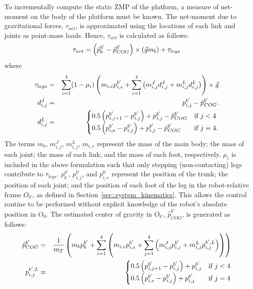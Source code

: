 		To incrementally compute the static ZMP of the platform, a measure of net-moment on the body of the platform must be known. The net-moment due to gravitational forces, $\tau_{net}$, is approximated using the locations of each link and joints as point-mass loads. Hence, $\tau_{net}$ is calculated as follows:
			\begin{equation}
				\tau_{net} 	=  \left(\bar{p}_{b}^{b'}-\hat{p}_{COG}^{b'} \right) \times \left(\vec{g} m_{b}\right)	+ \tau_{legs}
				\label{eq::net_moment}
			\end{equation}
		where
			\begin{eqnarray*}
					\tau_{legs}		& = & \sum_{i=1}^{4} (1-\mu_{i}) \left( m_{i,e} p_{i,e}^{b'} + \sum_{i=1}^{4}   \left( m_{i,j}^{J} d_{i,j}^{J} + m_{i,j}^{L} d_{i,j}^{L} \right) \right) \times \vec{g} \nonumber \\
					d_{i,j}^{J} 	& = & {{p}_{i,j}^{b'}-\hat{p}_{COG}^{b'}.} \nonumber \\														
					d_{i,j}^{L} 	& = &
					\begin{cases}
					{ 0.5  \left({p}_{i,j+1}^{b'}-{p}_{i,j}^{b'}\right) + {p}_{i,j}^{b'} - \hat{p}_{COG}^{b'}} 	&\text{if } j < 4 \\
					{ 0.5  \left({p}_{i,e}^{b'}-{p}_{i,j}^{b'}\right) + {p}_{i,j}^{b'} - \hat{p}_{COG}^{b'}} 		&\text{if } j = 4.
					\end{cases} \nonumber
				\label{eq::Levers}
			\end{eqnarray*}
		The terms $m_{b}$, $m_{i,j}^{J}$, $m_{i,j}^{L}$, $m_{i,e}$ represent the mass of the main body; the mass of each joint; the mass of each link; and the mass of each foot, respectively. $\mu_{i}$ is included in the above formulation such that only stepping (non-contacting) legs contribute to  $\tau_{legs}$. ${p}_{b}^{b'}$, ${p}_{i,j}^{b'}$, and ${p}_{i,e}^{b'}$ represent the position of the trunk; the position of each \Jth joint; and the position of each foot of the \Ith leg in the robot-relative frame $O_{b'}$, as defined in Section~\ref{sec::system_kinematics}. This allows the control routine to be performed without explicit knowledge of the robot's absolute position in $O_{0}$. The estimated center of gravity in $O_{b'}$, $\hat{p}_{COG}^{b'}$, is generated as follows:
			\begin{eqnarray}
				\hat{p}_{COG}^{b'} 	& = & \frac{1}{m_{T}}\left( m_{b}p_{b}^{b'} + \sum_{i=1}^{4} \left(m_{i,e}{p}_{i,e}^{b'} + \sum_{j=1}^{4} \left(  m_{i,j}^{J}{p}_{i,j}^{b'} +  m_{i,j}^{L}{p}_{i,j}^{b',L} \right) \right)\right) 	\nonumber \\
				{p}_{i,j}^{b',L} 	& = & 
					\begin{cases}
					{ 0.5  \left({p}_{i,j+1}^{b'}-{p}_{i,j}^{b'}\right) + {p}_{i,j}^{b'} } 	&\text{if } j < 4 \\
					{ 0.5  \left({p}_{i,e}^{b'}-{p}_{i,j}^{b'}\right) + {p}_{i,j}^{b'} } 		&\text{if } j = 4
					\end{cases}
				\label{eq::cog_estimate}
			\end{eqnarray}
